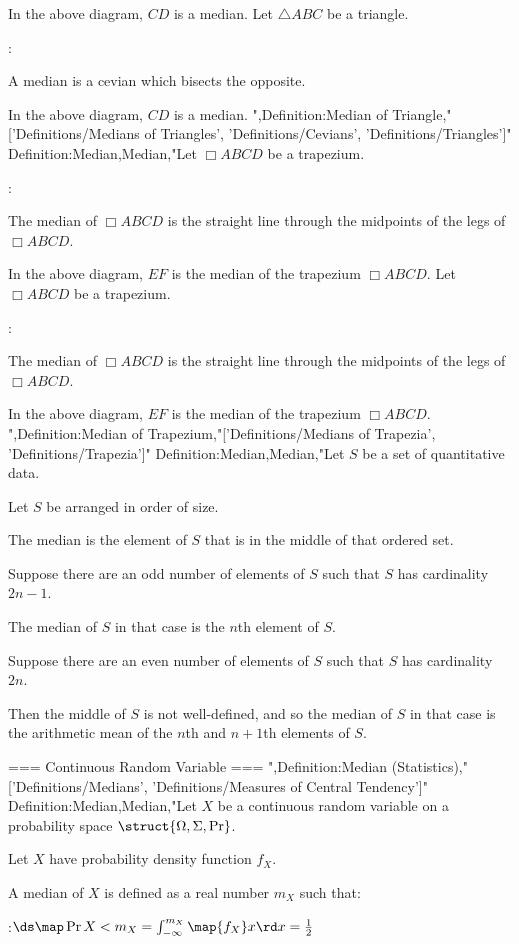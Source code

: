 In the above diagram, $CD$ is a median.
Let $\triangle ABC$ be a triangle.

:

A median is a cevian which bisects the opposite.


In the above diagram, $CD$ is a median.
",Definition:Median of Triangle,"['Definitions/Medians of Triangles', 'Definitions/Cevians', 'Definitions/Triangles']"
Definition:Median,Median,"Let $\Box ABCD$ be a trapezium.

:

The median of $\Box ABCD$ is the straight line through the midpoints of the legs of $\Box ABCD$.


In the above diagram, $EF$ is the median of the trapezium $\Box ABCD$.
Let $\Box ABCD$ be a trapezium.

:

The median of $\Box ABCD$ is the straight line through the midpoints of the legs of $\Box ABCD$.


In the above diagram, $EF$ is the median of the trapezium $\Box ABCD$.
",Definition:Median of Trapezium,"['Definitions/Medians of Trapezia', 'Definitions/Trapezia']"
Definition:Median,Median,"Let $S$ be a set of quantitative data.

Let $S$ be arranged in order of size.

The median is the element of $S$ that is in the middle of that ordered set.


Suppose there are an odd number of elements of $S$ such that $S$ has cardinality $2 n - 1$.

The median of $S$ in that case is the $n$th element of $S$.


Suppose there are an even number of elements of $S$ such that $S$ has cardinality $2 n$.

Then the middle of $S$ is not well-defined, and so the median of $S$ in that case is the arithmetic mean of the $n$th and $n + 1$th elements of $S$.


=== Continuous Random Variable ===
",Definition:Median (Statistics),"['Definitions/Medians', 'Definitions/Measures of Central Tendency']"
Definition:Median,Median,"Let $X$ be a continuous random variable on a probability space $\struct {\Omega, \Sigma, \Pr}$.

Let $X$ have probability density function $f_X$. 

A median of $X$ is defined as a real number $m_X$ such that: 

:$\ds \map \Pr {X < m_X} = \int_{-\infty}^{m_X} \map {f_X} x \rd x = \frac 1 2$


